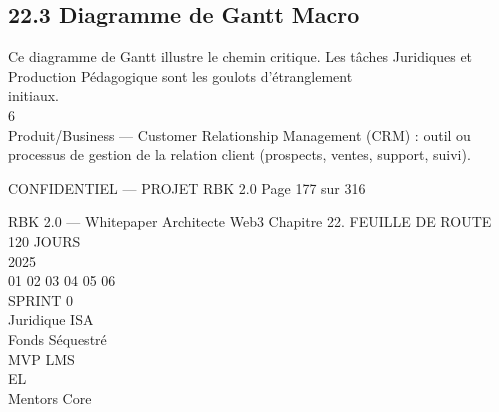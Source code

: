 \subsection{22.3 Diagramme de Gantt Macro}
Ce diagramme de Gantt illustre le chemin critique. Les tâches Juridiques et Production Pédagogique sont les goulots d’étranglement\\
initiaux.\\
6\\
Produit/Business — Customer Relationship Management (CRM) : outil ou processus de gestion de la relation client (prospects, ventes, support, suivi).\\
\vspace{0.5em}
\vspace{0.5em}
\vspace{0.5em}
\vspace{0.5em}
\begin{confidential}CONFIDENTIEL — PROJET RBK 2.0                                            Page 177 sur 316\end{confidential}
RBK 2.0 — Whitepaper Architecte Web3                                             Chapitre 22. FEUILLE DE ROUTE 120 JOURS\\
\vspace{0.5em}
\vspace{0.5em}
\vspace{0.5em}
2025\\
\vspace{0.5em}
01    02               03            04                 05           06\\
\vspace{0.5em}
\vspace{0.5em}
SPRINT 0\\
\vspace{0.5em}
Juridique ISA\\
\vspace{0.5em}
Fonds Séquestré\\
\vspace{0.5em}
MVP LMS\\
\vspace{0.5em}
\vspace{0.5em}
\vspace{0.5em}
\vspace{0.5em}
EL\\
Mentors Core\\
\vspace{0.5em}
\vspace{0.5em}
\vspace{0.5em}
